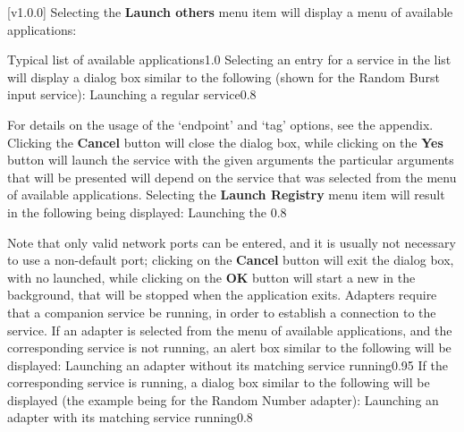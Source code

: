 [v1.0.0]
Selecting the \textbf{Launch others \textellipsis} menu item will display a menu of
available applications:

%
{Typical list of available applications}{1.0}
\condPage{}
Selecting an entry for a service in the list will display a dialog box similar to the
following (shown for the Random Burst input service):
%
{Launching a regular service}{0.8}

For details on the usage of the `endpoint' and `tag' options, see the 
 appendix.
Clicking the \textbf{Cancel} button will close the dialog box, while clicking on the
\textbf{Yes} button will launch the service with the given arguments \longDash{} the
particular arguments that will be presented will depend on the service that was selected
from the menu of available applications.
\secondaryEnd
\condPage
{}
Selecting the \textbf{Launch Registry} menu item will result in the following being
displayed:
%
{Launching the \emph{\RS}}{0.8}

Note that only valid network ports can be entered, and it is usually not necessary to use
a non-default port; clicking on the \textbf{Cancel} button will exit the dialog box, with
no \emph{\RS} launched, while clicking on the \textbf{OK} button will start a new
\emph{\RS} in the background, that will be stopped when the \emph{\MMMU} application
exits.
\secondaryEnd
{}
Adapters require that a companion service be running, in order to establish a connection
to the service.
If an adapter is selected from the menu of available applications, and the corresponding
service is not running, an alert box similar to the following will be displayed:
%
{Launching an adapter without its matching service running}{0.95}
\condPage{}
If the corresponding service is running, a dialog box similar to the following will be
displayed (the example being for the Random Number adapter):
%
{Launching an adapter with its matching service running}{0.8}

